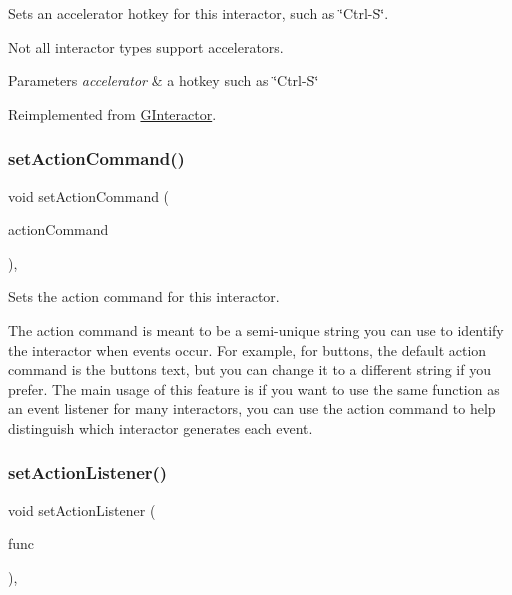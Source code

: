 Sets an accelerator hotkey for this interactor, such as \char`\"{}\+Ctrl-\/\+S\char`\"{}. 

Not all interactor types support accelerators. 
\begin{DoxyParams}{Parameters}
{\em accelerator} & a hotkey such as \char`\"{}\+Ctrl-\/\+S\char`\"{} \\
\hline
\end{DoxyParams}


Reimplemented from \mbox{\hyperlink{classsgl_1_1GInteractor_ad15f102f62e2960576012f1aa0ba4b2e}{G\+Interactor}}.

\mbox{\label{classsgl_1_1GInteractor_a4b5843fe3030e038a1ba54cc03389bcf}} 
\subsubsection{\texorpdfstring{set\+Action\+Command()}{setActionCommand()}}
{\footnotesize\ttfamily void set\+Action\+Command (\begin{DoxyParamCaption}\item[{const std\+::string \&}]{action\+Command }\end{DoxyParamCaption})\hspace{0.3cm}{\ttfamily [virtual]}, {\ttfamily [inherited]}}



Sets the action command for this interactor. 

The action command is meant to be a semi-\/unique string you can use to identify the interactor when events occur. For example, for buttons, the default action command is the button\textquotesingle{}s text, but you can change it to a different string if you prefer. The main usage of this feature is if you want to use the same function as an event listener for many interactors, you can use the action command to help distinguish which interactor generates each event. \mbox{\label{classsgl_1_1GInteractor_adcfb4742430c88714fcf57e57ab8ea9c}} 
\subsubsection{\texorpdfstring{set\+Action\+Listener()}{setActionListener()}\hspace{0.1cm}{\footnotesize\ttfamily [1/2]}}
{\footnotesize\ttfamily void set\+Action\+Listener (\begin{DoxyParamCaption}\item[{\mbox{\hyperlink{namespacesgl_ae9f3e9eab70035da1a2b114e21357b25}{G\+Event\+Listener}}}]{func }\end{DoxyParamCaption})\hspace{0.3cm}{\ttfamily [virtual]}, {\ttfamily [inherited]}}



